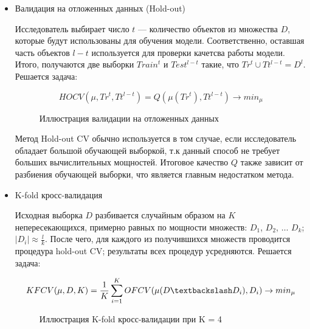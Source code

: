 \documentclass[a4paper, 14pt]{article}
\begin{document}
\label{CV_methods}
\begin{itemize}
	\item Валидация на отложенных данных (Hold-out)
	
	Исследователь выбирает число $t$ --- количество объектов из множества $D$, которые будут использованы для обучения модели. Соответственно, оставшая часть объектов $l - t$ используется для проверки качетсва работы модели. Итого, получаются две выборки $Train^t \text{ и } Test^{l-t}$ такие, что $Tr^t \cup Tt^{l-t} = D^l$. Решается задача:
	
	\[HOCV(\mu, Tr^t, Tt^{l-t}) = Q(\mu (Tr^t), Tt^{l-t}) \rightarrow min_{\mu} \] 
	
	\begin{figure}[h]
		\label{ris: ho}
		\caption{Иллюстрация валидации на отложенных данных}
	\end{figure}
	
	
	Метод Hold-out CV обычно используется в том случае, если исследователь обладает большой обучающей выборкой, т.к данный способ не требует больших вычислительных мощностей. Итоговое качество $Q$ также зависит от разбиения обучающей выборки, что является главным недостатком метода. 
	
	\item K-fold кросс-валидация 
	
	Исходная выборка $D$ разбивается случайным образом на $K$ непересекающихся, примерно равных по мощности множеств: $D_1$, $D_2$, $\dots$ $D_k$; $\left|D_i\right| \approx \frac{l}{k}$. После чего, для каждого из получившихся множеств проводится процедура hold-out CV; результаты всех процедур усредняются. Решается задача:
	
	\[KFCV(\mu, D, K) = \frac{1}{K} \sum_{i=1}^{K} OFCV(\mu(D \textbackslash D_i), D_i) \rightarrow min_{\mu} \]
	
	\begin{figure}[h]
		\label{ris: kfold}
		\caption{Иллюстрация K-fold кросс-валидации при K = 4}
	\end{figure}
	

\end{itemize}
\end{document}

